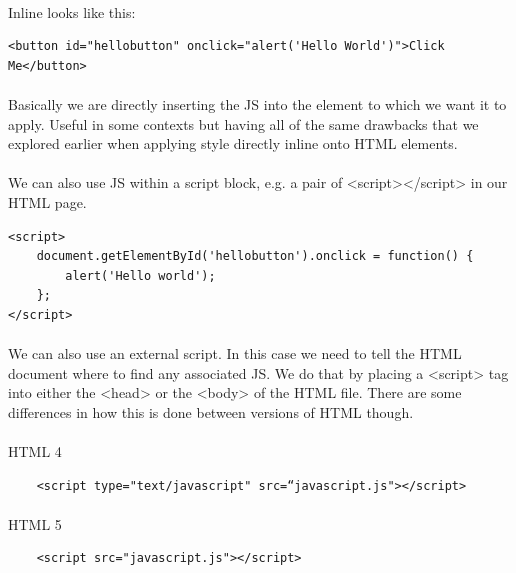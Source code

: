 \paragraph{} Inline looks like this:

\begin{lstlisting}
<button id="hellobutton" onclick="alert('Hello World')">Click Me</button>
\end{lstlisting}

\paragraph{} Basically we are directly inserting the JS into the element to which we want it to apply. Useful in some contexts but having all of the same drawbacks that we explored earlier when applying style directly inline onto HTML elements.

\paragraph{} We can also use JS within a script block, e.g. a pair of <script></script> in our HTML page.

\begin{lstlisting}
<script>
    document.getElementById('hellobutton').onclick = function() {
        alert('Hello world');
    };
</script>
\end{lstlisting}


\paragraph{} We can also use an external script. In this case we need to tell the HTML document where to find any associated JS. We do that by placing a <script> tag into either the <head> or the <body> of the HTML file. There are some differences in how this is done between versions of HTML though.

\paragraph{} HTML 4

\begin{lstlisting}
	<script type="text/javascript" src=“javascript.js"></script>
\end{lstlisting}

\paragraph{} HTML 5
\begin{lstlisting}
	<script src="javascript.js"></script>
\end{lstlisting}

